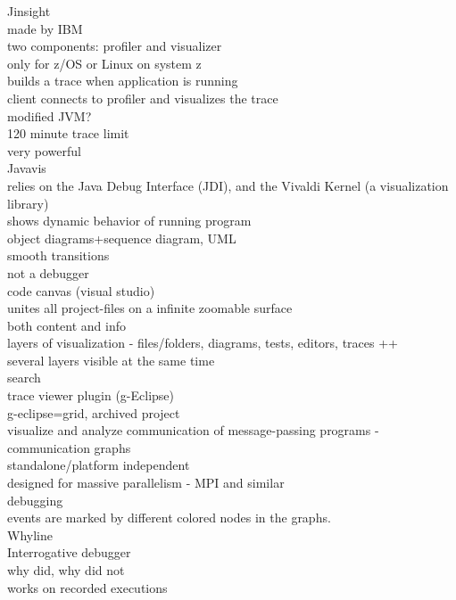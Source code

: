 Jinsight\\%
	made by IBM\\
	two components: profiler and visualizer\\
	only for z/OS or Linux on system z\\
	builds a trace when application is running\\
	client connects to profiler and visualizes the trace\\
	modified JVM?\\
	120 minute trace limit\\
	very powerful\\

Javavis\\
	relies on the Java Debug Interface (JDI), and the Vivaldi Kernel (a visualization library)\\
	shows dynamic behavior of running program\\
	object diagrams+sequence diagram, UML\\
	smooth transitions\\
	not a debugger\\
	
code canvas (visual studio)\\%
	unites all project-files on a infinite zoomable surface\\
	both content and info\\
	layers of visualization - files/folders, diagrams, tests, editors, traces ++\\
	several layers visible at the same time\\
	search\\

trace viewer plugin (g-Eclipse)\\%
	g-eclipse=grid, archived project\\
	visualize and analyze communication of message-passing programs - communication graphs\\
	standalone/platform independent\\
	designed for massive parallelism - MPI and similar\\
	debugging\\
	events are marked by different colored nodes in the graphs.\\

Whyline\\%
	Interrogative debugger\\
	why did, why did not\\
	works on recorded executions\\

